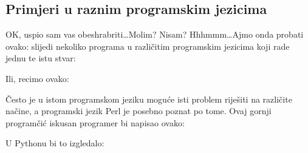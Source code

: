 	\subsection{Primjeri u raznim programskim jezicima}

	OK, uspio sam vas obeshrabriti\dots Molim? Nisam? Hhhmmm\dots Ajmo onda probati
	ovako: slijedi nekoliko programa u različitim programskim jezicima koji rade
	jednu te istu stvar:


	Ili, recimo ovako:


	Često je u istom programskom jeziku moguće isti problem riješiti na
	različite načine, a programski jezik Perl je posebno poznat po tome. 
	Ovaj gornji programčić iskusan programer bi napisao ovako:


	U Pythonu bi to izgledalo:

	
